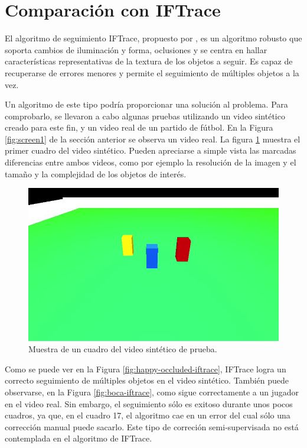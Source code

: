 \section{Comparación con IFTrace}
\label{sec:iftrace}

El algoritmo de seguimiento IFTrace, propuesto por \citeauthor*{IFTrace}, es un
algoritmo robusto que soporta cambios de iluminación y forma, oclusiones y se
centra en hallar características representativas de la textura de los objetos a
seguir. Es capaz de recuperarse de errores menores y permite el seguimiento de
múltiples objetos a la vez.

Un algoritmo de este tipo podría proporcionar una solución al problema. Para
comprobarlo, se llevaron a cabo algunas pruebas utilizando un video sintético
creado para este fin, y un video real de un partido de fútbol. En la Figura
\ref{fig:screen1} de la sección anterior se observa un video real. La figura
\ref{fig:sample-happy-occluded} muestra el primer cuadro del video sintético. Pueden
apreciarse a simple vista las marcadas diferencias entre ambos videos, como por
ejemplo la resolución de la imagen y el tamaño y la complejidad de los objetos
de interés.

\begin{figure}[H]
    \centering
    \includegraphics[width=\linewidth]{./images/sample_happy_occluded.png}
    \caption{Muestra de un cuadro del video sintético de prueba.}
    \label{fig:sample-happy-occluded}
\end{figure}

Como se puede ver en la Figura \ref{fig:happy-occluded-iftrace}, IFTrace logra
un correcto seguimiento de múltiples objetos en el video sintético. También
puede observarse, en la Figura \ref{fig:boca-iftrace}, como sigue correctamente
a un jugador en el video real. Sin embargo, el seguimiento sólo es exitoso
durante unos pocos cuadros, ya que, en el cuadro 17, el algoritmo cae en un
error del cual sólo una corrección manual puede sacarlo. Este tipo de correción
semi-supervisada no está contemplada en el algoritmo de IFTrace.

